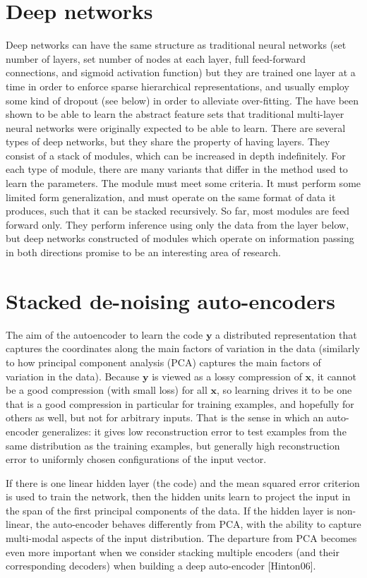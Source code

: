 \documentclass[12pt]{article}
\begin{document}
	\section{Deep networks}
Deep networks can have the same structure as traditional neural networks (set number of layers, set number of nodes at each layer, full feed-forward connections, and sigmoid activation function) but they are trained one layer at a time in order to enforce sparse hierarchical representations, and usually employ some kind of dropout (see below) in order to alleviate over-fitting. The have been shown to be able to learn the abstract feature sets that traditional multi-layer neural networks were originally expected to be able to learn. There are several types of deep networks, but they share the property of having layers. They consist of a stack of modules, which can be increased in depth indefinitely. For each type of module, there are many variants that differ in the method used to learn the parameters. The module must meet some criteria. It must perform some limited form generalization, and must operate on the same format of data it produces, such that it can be stacked recursively. So far, most modules are feed forward only. They perform inference using only the data from the layer below, but deep networks constructed of modules which operate on information passing in both directions promise to be an interesting area of research.

	\section{Stacked de-noising auto-encoders}
The aim of the autoencoder to learn the code $\mathbf y$ a distributed representation that captures the coordinates along the main factors of variation in the data (similarly to how principal component analysis (PCA) captures the main factors of variation in the data). Because $\mathbf y$ is viewed as a lossy compression of $\mathbf x$, it cannot be a good compression (with small loss) for all $\mathbf x$, so learning drives it to be one that is a good compression in particular for training examples, and hopefully for others as well, but not for arbitrary inputs. That is the sense in which an auto-encoder generalizes: it gives low reconstruction error to test examples from the same distribution as the training examples, but generally high reconstruction error to uniformly chosen configurations of the input vector.

If there is one linear hidden layer (the code) and the mean squared error criterion is used to train the network, then the  hidden units learn to project the input in the span of the first  principal components of the data. If the hidden layer is non-linear, the auto-encoder behaves differently from PCA, with the ability to capture multi-modal aspects of the input distribution. The departure from PCA becomes even more important when we consider stacking multiple encoders (and their corresponding decoders) when building a deep auto-encoder [Hinton06].
\end{document}
